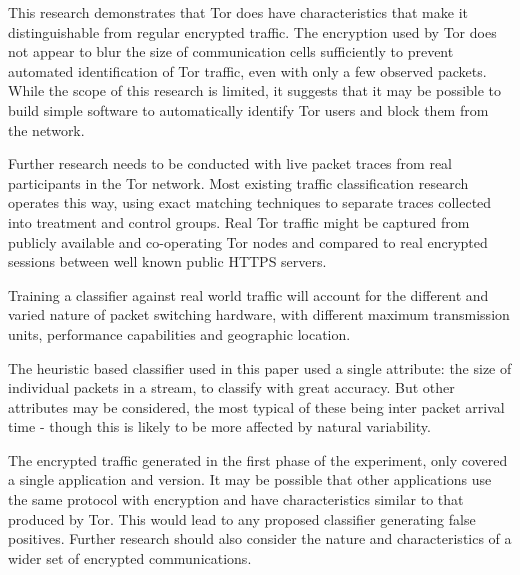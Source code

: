 This research demonstrates that Tor does have characteristics that make it
distinguishable from regular encrypted traffic. The encryption used by Tor does
not appear to blur the size of communication cells sufficiently to prevent
automated identification of Tor traffic, even with only a few observed packets.
While the scope of this research is limited, it suggests that it may be
possible to build simple software to automatically identify Tor users and block
them from the network.

Further research needs to be conducted with live packet traces from real
participants in the Tor network. Most existing traffic classification research
operates this way, using exact matching techniques to separate traces collected
into treatment and control groups. Real Tor traffic might be captured from
publicly available and co-operating Tor nodes and compared to real encrypted
sessions between well known public HTTPS servers.

Training a classifier against real world traffic will account for the different
and varied nature of packet switching hardware, with different maximum
transmission units, performance capabilities and geographic location.

The heuristic based classifier used in this paper used a single attribute: the
size of individual packets in a stream, to classify with great accuracy. But
other attributes may be considered, the most typical of these being inter
packet arrival time - though this is likely to be more affected by natural
variability.

The encrypted traffic generated in the first phase of the experiment, only
covered a single application and version. It may be possible that other
applications use the same protocol with encryption and have characteristics
similar to that produced by Tor. This would lead to any proposed classifier
generating false positives. Further research should also consider the nature
and characteristics of a wider set of encrypted communications.
